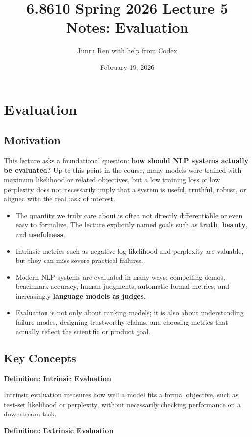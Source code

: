 \documentclass[11pt]{article}
\title{6.8610 Spring 2026 Lecture 5 Notes: Evaluation}
\author{Junru Ren with help from Codex}
\date{February 19, 2026}
\begin{document}
\maketitle

\section{Evaluation}

\subsection{Motivation}
This lecture asks a foundational question: \textbf{how should NLP systems actually be evaluated?} Up to this point in the course, many models were trained with maximum likelihood or related objectives, but a low training loss or low perplexity does not necessarily imply that a system is useful, truthful, robust, or aligned with the real task of interest.

\begin{itemize}
    \item The quantity we truly care about is often not directly differentiable or even easy to formalize. The lecture explicitly named goals such as \textbf{truth}, \textbf{beauty}, and \textbf{usefulness}.
    \item Intrinsic metrics such as negative log-likelihood and perplexity are valuable, but they can miss severe practical failures.
    \item Modern NLP systems are evaluated in many ways: compelling demos, benchmark accuracy, human judgments, automatic formal metrics, and increasingly \textbf{language models as judges}.
    \item Evaluation is not only about ranking models; it is also about understanding failure modes, designing trustworthy claims, and choosing metrics that actually reflect the scientific or product goal.
\end{itemize}

\subsection{Key Concepts}
\textbf{Definition: Intrinsic Evaluation}

Intrinsic evaluation measures how well a model fits a formal objective, such as test-set likelihood or perplexity, without necessarily checking performance on a downstream task.

\textbf{Definition: Extrinsic Evaluation}
\end{document}
